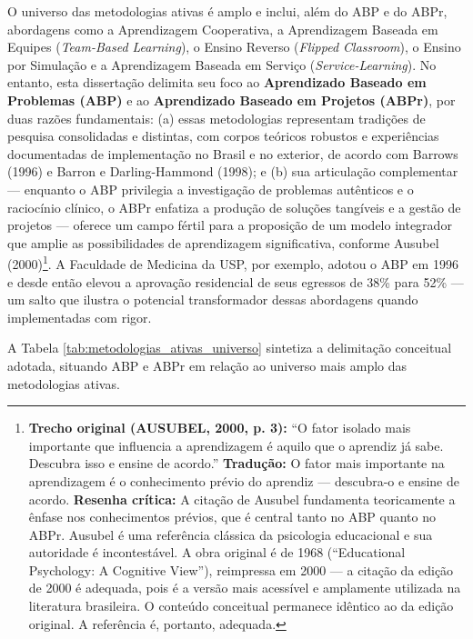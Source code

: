 O universo das metodologias ativas é amplo e inclui, além do ABP e do ABPr, abordagens como a Aprendizagem Cooperativa, a Aprendizagem Baseada em Equipes (\textit{Team-Based Learning}), o Ensino Reverso (\textit{Flipped Classroom}), o Ensino por Simulação e a Aprendizagem Baseada em Serviço (\textit{Service-Learning}). No entanto, esta dissertação delimita seu foco ao \textbf{Aprendizado Baseado em Problemas (ABP)} e ao \textbf{Aprendizado Baseado em Projetos (ABPr)}, por duas razões fundamentais: (a) essas metodologias representam tradições de pesquisa consolidadas e distintas, com corpos teóricos robustos e experiências documentadas de implementação no Brasil e no exterior, de acordo com Barrows (1996) e Barron e Darling-Hammond (1998); e (b) sua articulação complementar — enquanto o ABP privilegia a investigação de problemas autênticos e o raciocínio clínico, o ABPr enfatiza a produção de soluções tangíveis e a gestão de projetos — oferece um campo fértil para a proposição de um modelo integrador que amplie as possibilidades de aprendizagem significativa, conforme Ausubel (2000)\footnote{\textbf{Trecho original (AUSUBEL, 2000, p. 3):} ``O fator isolado mais importante que influencia a aprendizagem é aquilo que o aprendiz já sabe. Descubra isso e ensine de acordo.'' \textbf{Tradução:} O fator mais importante na aprendizagem é o conhecimento prévio do aprendiz — descubra-o e ensine de acordo. \textbf{Resenha crítica:} A citação de Ausubel fundamenta teoricamente a ênfase nos conhecimentos prévios, que é central tanto no ABP quanto no ABPr. Ausubel é uma referência clássica da psicologia educacional e sua autoridade é incontestável. A obra original é de 1968 (``Educational Psychology: A Cognitive View''), reimpressa em 2000 — a citação da edição de 2000 é adequada, pois é a versão mais acessível e amplamente utilizada na literatura brasileira. O conteúdo conceitual permanece idêntico ao da edição original. A referência é, portanto, adequada.}. A Faculdade de Medicina da USP, por exemplo, adotou o ABP em 1996 e desde então elevou a aprovação residencial de seus egressos de 38\% para 52\% — um salto que ilustra o potencial transformador dessas abordagens quando implementadas com rigor.

A Tabela \ref{tab:metodologias_ativas_universo} sintetiza a delimitação conceitual adotada, situando ABP e ABPr em relação ao universo mais amplo das metodologias ativas.

